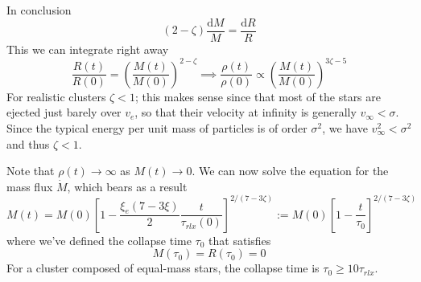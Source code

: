 In conclusion
\begin{equation*}
    (2-\zeta)\frac{\text{d}M}{M} = \frac{\text{d}R}{R}
\end{equation*}
This we can integrate right away
\begin{equation*}
    \frac{R(t)}{R(0)} = \left(\frac{M(t)}{M(0)}\right)^{2-\zeta}\implies \frac{\rho(t)}{\rho(0)}\propto \left(\frac{M(t)}{M(0)}\right)^{3\zeta-5}
\end{equation*}
For realistic clusters $\zeta < 1$; this makes sense since that most of the stars are ejected just barely over $v_{e}$, so that their velocity at infinity is generally $v_{\infty}<\sigma$. Since the typical energy per unit mass of particles is of order $\sigma^{2}$, we have $v^{2}_{\infty}<\sigma^{2}$ and thus $\zeta < 1$.
\par Note that $\rho(t)\to\infty$ as $M(t)\to 0$. We can now solve the equation for the mass flux $\dot{M}$, which bears as a result
\begin{equation*}
    M(t) = M(0)\left[1-\frac{\xi_{e}(7-3\xi)}{2}\frac{t}{\tau_{rlx}(0)}\right]^{2/(7-3\zeta)} := M(0)\left[1-\frac{t}{\tau_{0}}\right]^{2/(7-3\zeta)}
\end{equation*}
where we've defined the collapse time $\tau_{0}$ that satisfies 
\begin{equation*}
    M(\tau_{0}) = R(\tau_{0}) = 0
\end{equation*}
For a cluster composed of equal-mass stars, the collapse time is $\tau_{0}\geq 10\tau_{rlx}$.

